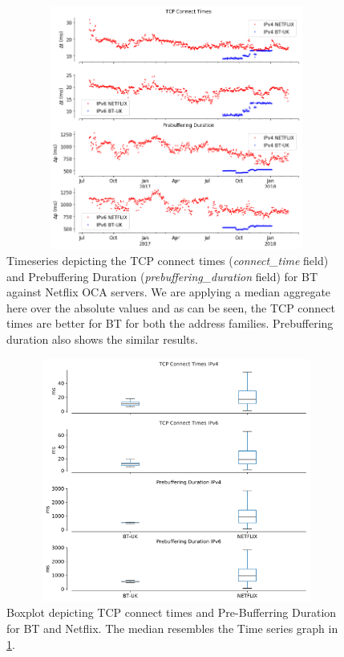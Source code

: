 \begin{figure}[!ht]
	\centering
	\includegraphics[keepaspectratio, height=8cm, width=15cm]{figures/cache/btuk/netflix-tcp-pd-delay-timeseries-asn-2856-separate.png}
	\caption[BT-UK TCP Connect Times and Pre-Buffering Duration Timeseries Absolute]{Timeseries depicting the TCP connect times (\textit{connect\_time} field) and Prebuffering Duration (\textit{prebuffering\_duration} field) for BT against Netflix OCA servers. 
	We are applying a median aggregate here over the absolute values and as can be seen, the TCP connect times are better for BT for both the address families. Prebuffering duration also shows the similar results.}
	\label{fig:BT-UK TCP Connect Times and Pre-Buffering Duration Timeseries Absolute}
\end{figure}

\begin{figure}[!ht]
	\centering
	\includegraphics[keepaspectratio, height=8cm, width=15cm]{figures/cache/btuk/netflix-tcp-prebuffering-delay-boxplot-btuk-seprate.pdf}
	\caption[BT-UK TCP Connect Times and Pre-Buffering Duration Boxplot Absolute]{Boxplot depicting TCP connect times and Pre-Bufferring Duration for BT and Netflix. 
	The median resembles the Time series graph in \cref{fig:BT-UK TCP Connect Times and Pre-Buffering Duration Timeseries Absolute}.}
	\label{fig:BT-UK TCP Connect Times and Pre-Buffering Duration Boxplot Absolute}
\end{figure}

